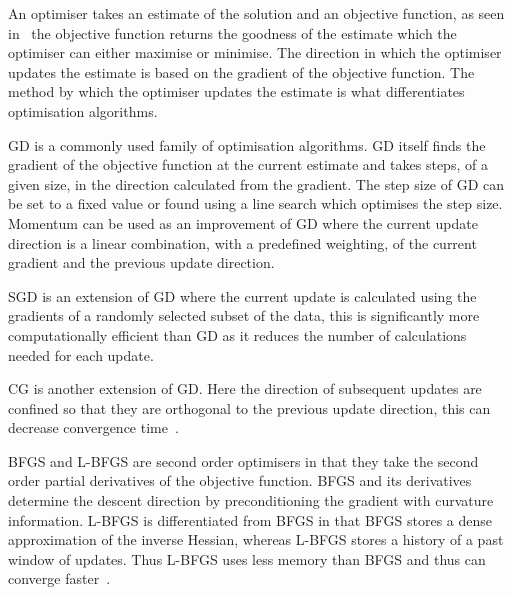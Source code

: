                 An optimiser takes an estimate of the solution and an objective function, as seen in~ the objective function returns the goodness of the estimate which the optimiser can either maximise or minimise. The direction in which the optimiser updates the estimate is based on the gradient of the objective function. The method by which the optimiser updates the estimate is what differentiates optimisation algorithms.
                
                \gls{GD} is a commonly used family of optimisation algorithms. \gls{GD} itself finds the gradient of the objective function at the current estimate %
                and takes steps, of a given size,  in the direction calculated from the gradient. %
                The step size of \gls{GD} can be set to a fixed value or found using a line search which optimises the step size. Momentum can be used as an improvement of \gls{GD} where the current update direction is a linear combination, with a predefined weighting, of the current gradient and the previous update direction.
                
                \gls{SGD} is an extension of \gls{GD} where the current update is calculated using the gradients of a randomly selected subset of the data, %
                this is significantly more computationally efficient than \gls{GD} as it reduces the number of calculations needed for each update.
                
                \gls{CG} is another extension of \gls{GD}. Here the direction of subsequent updates are confined so that they are orthogonal to the previous update direction, this can decrease convergence time~. %
                
                \gls{BFGS} and \gls{L-BFGS} are second order optimisers in that they take the second order partial derivatives of the objective function. \gls{BFGS} and its derivatives determine the descent direction by preconditioning the gradient with curvature information. \gls{L-BFGS} is differentiated from \gls{BFGS} in that \gls{BFGS} stores a dense approximation of the inverse Hessian, whereas \gls{L-BFGS} stores a history of a past window of updates. Thus \gls{L-BFGS} uses less memory than \gls{BFGS} and thus can converge faster~.
                
